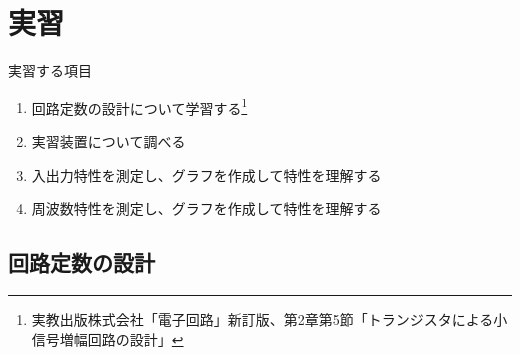 \documentclass[uplatex,a4paper,11pt,oneside,openany]{jsbook}
\begin{document}
\section{実習}

実習する項目
\begin{enumerate}
\item[(1)] 回路定数の設計について学習する\footnote{実教出版株式会社「電子回路」新訂版、第2章第5節「トランジスタによる小信号増幅回路の設計」}
\item[(2)] 実習装置について調べる
\item[(3)] 入出力特性を測定し、グラフを作成して特性を理解する
\item[(4)] 周波数特性を測定し、グラフを作成して特性を理解する
\end{enumerate}

\newpage

\subsection{回路定数の設計}
\end{document}
